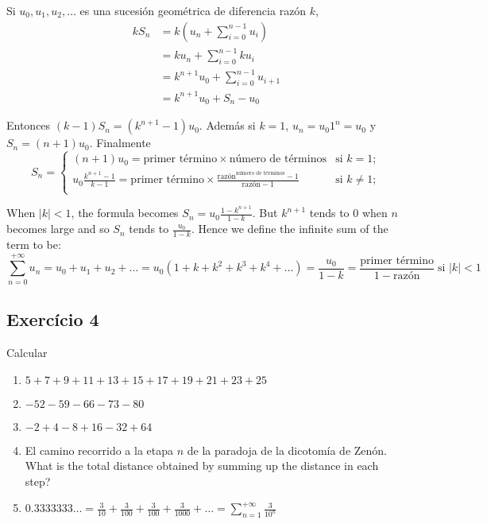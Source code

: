 Si $u_0, u_1, u_2, \ldots$ es una sucesión geométrica de diferencia razón $k$,
$$
\begin{aligned}
k S_n &= k \left( u_n + \sum_{i=0}^{n-1} u_i \right)\\
      &= {k u_n} + \sum_{i=0}^{n-1} {k u_{i}} \\
      &= {k^{n+1} u_0} + \sum_{i=0}^{n-1} {u_{i+1}} \\
      &= k^{n+1} u_0 + S_n - u_0
\end{aligned}
$$

Entonces ${(k - 1)} S_n = {(k^{n+1} - 1)} u_0$. Además si $k=1$,
$u_n = u_0 1^n = u_0$ y $S_n = (n+1) u_0$. Finalmente
$$
S_n =
\begin{cases}
{(n+1)} u_0 = \text{primer término} \times \text{número de términos}
& \text{si $k = 1$}; \\
u_0 \frac{k^{n+1} - 1}{k-1}
= \text{primer término} \times
\frac{\text{razón}^{\text{número de términos}} - 1}{\text{razón} - 1}
& \text{si $k \neq 1$}; \\
\end{cases}
$$

When $|k| < 1$, the formula becomes $S_n = u_0 \frac{1 - k^{n+1}}{1 - k}$.
But $k^{n+1}$ tends to $0$ when $n$ becomes large and so
$S_n$ tends to $\frac{u_0}{1-k}$. Hence we define
the infinite sum of the term to be:
%
$$
{\sum_{n=0}^{+\infty} u_n} = {u_0+u_1+u_2+\ldots} =
{u_0 \left(1 + k + k^2 + k^3 + k^4 + \ldots \right)} =
\frac{u_0}{1-k} =
\frac{\text{primer término}}{1 - \text{razón}} \; \text{si $|k| < 1$}
$$
%

\subsection*{Exercício 4}

Calcular

\begin{enumerate}
\item $5 + 7 + 9 + 11 + 13 + 15 + 17 + 19 + 21 + 23 + 25$
\item $-52 - 59 - 66 -73 - 80$
\item $-2 + 4 - 8 + 16 - 32 + 64$
\item El camino recorrido a la etapa $n$ de la paradoja de la dicotomía de
  Zenón. What is the total distance obtained by summing up the distance
  in each step?
\item $0.3333333\ldots = \frac{3}{10} + \frac{3}{100} + \frac{3}{100} +
  \frac{3}{1000} + \ldots = \sum_{n=1}^{+\infty} \frac{3}{10^n}$
\end{enumerate}


